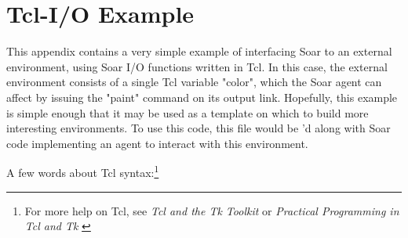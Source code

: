 \chapter{Tcl-I/O Example}
\label{Tcl-I/O}

This appendix contains a very simple example of interfacing Soar to an external environment,
using Soar I/O functions written in Tcl. In this case, the external environment consists of a 
single Tcl variable "color", which the Soar agent can affect by issuing the "paint" command
on its output link. Hopefully, this example is simple enough that it may be used as a template
on which to build more interesting environments. To use this code, this file would be 'd
along with Soar code implementing an agent to interact with this environment.

A few words about Tcl syntax:\footnote{For more help on Tcl, see \emph{Tcl and the Tk Toolkit}
\cite{Ousterhout94} or \emph{Practical
Programming in Tcl and Tk} \cite{Welch95}}

